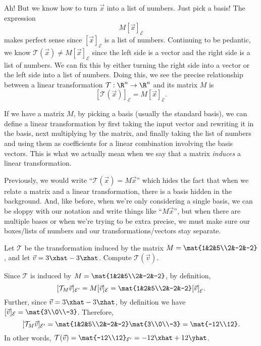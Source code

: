 Ah! But we know how to turn $\vec x$ into a list of numbers. Just pick a basis! The expression
\[
	M[\vec x]_{\mathcal E}
\]
makes perfect sense since $[\vec x]_{\mathcal E}$ is a list of numbers. Continuing to be pedantic, we know
$\mathcal T(\vec x)\neq M[\vec x]_{\mathcal E}$ since the left side is a vector and the right side is a list of numbers.
We can fix this by either turning the right side into a vector or the left side into a list of numbers.
Doing this, we see the precise relationship between a linear transformation $\mathcal T:\R^n\to\R^n$ and its matrix $M$ is
\[
	[\mathcal T(\vec x)]_{\mathcal E}=M[\vec x]_{\mathcal E}.
\]

If we have a matrix $M$, by picking a basis (usually the standard basis),
we can define a linear transformation by first taking the input vector and rewriting it in the basis,
next multiplying by the matrix, and finally taking the list of numbers and using them as coefficients
for a linear combination involving the basis vectors. This is what we actually mean
when we say that a matrix \emph{induces} a linear transformation.


Previously, we would write ``$\mathcal T(\vec x)=M\vec x$'' which hides the fact that when we relate a matrix and a linear
transformation, there is a basis hidden in the background. And, like before, when we're only considering a single basis,
we can be sloppy with our notation and write things like ``$M\vec x$'', but when there are multiple bases or when we're
trying to be extra precise, we must make sure our boxes/lists of numbers and our transformations/vectors stay separate.

\begin{example}
	Let $\mathcal T$ be the transformation induced by the matrix $M=\mat{1&2&5\\2&-2&-2}$,
	and let $\vec v=3\xhat-3\zhat$. Compute $\mathcal T(\vec v)$.

	Since $\mathcal T$ is induced by $M=\mat{1&2&5\\2&-2&-2}$, by definition, 	
	\[
	    [\mathcal T_{M}\vec v]_{\mathcal E'}= M[\vec v]_{\mathcal E}=\mat{1&2&5\\2&-2&-2}[\vec v]_{\mathcal E}.
	\]
	Further, since $\vec v=3\xhat-3\zhat$, by definition we have $[\vec v]_{\mathcal E}=\mat{3\\0\\-3}$. Therefore,
	\[
	    [\mathcal T_{M}\vec v]_{\mathcal E'}=\mat{1&2&5\\2&-2&-2}\mat{3\\0\\-3}=\mat{-12\\12}.
	\]
	In other words, $\mathcal T(\vec v) = \mat{-12\\12}_{\mathcal E'}=-12\xhat+12\yhat$.
\end{example}

